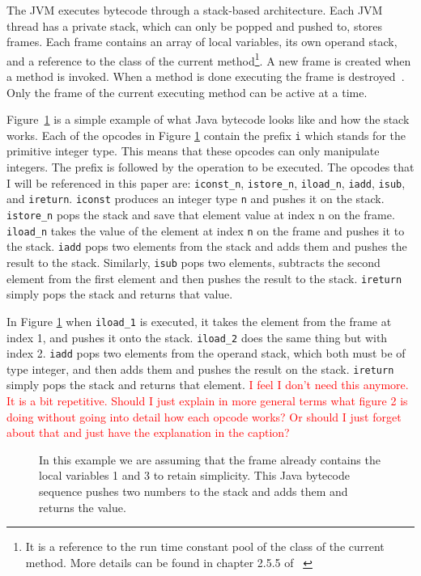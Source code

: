 \documentclass{sig-alternate}
\newcommand{\mycomment}[1]{\textcolor{red}{#1}}
\begin{document}
The JVM executes bytecode through a stack-based architecture. Each JVM thread has a private stack, which can only be popped and pushed to, stores frames. Each frame contains an array of local variables, its own operand stack, and a reference to the class of the current method\footnote{It is a reference to the run time constant pool of the class of the current method. More details can be found in chapter 2.5.5 of ~\cite{JVMspec:2013}}. A new frame is created when a method is invoked. When a method is done executing the frame is destroyed~\cite{Oracle:2013}. Only the frame of the current executing method can be active at a time.

Figure~\ref{stack} is a simple example of what Java bytecode looks like and how the stack works. Each of the opcodes in Figure \ref{stack} contain the prefix \texttt{i} which stands for the primitive integer type. This means that these opcodes can only manipulate integers. The prefix is followed by the operation to be executed. The opcodes that I will be referenced in this paper are: \texttt{iconst\_n}, \texttt{istore\_n}, \texttt{iload\_n}, \texttt{iadd}, \texttt{isub}, and \texttt{ireturn}. \texttt{iconst} produces an integer type \texttt{n} and pushes it on the stack. \texttt{istore\_n} pops the stack and save that element value at index n on the frame. \texttt{iload\_n} takes the value of the element at index \texttt{n} on the frame and pushes it to the stack. \texttt{iadd} pops two elements from the stack and adds them and pushes the result to the stack. Similarly, \texttt{isub} pops two elements, subtracts the second element from the first element and then pushes the result to the stack. \texttt{ireturn} simply pops the stack and returns that value.

In Figure \ref{stack} when \texttt{iload\_1} is executed, it takes the element from the frame at index 1, and pushes it onto the stack. \texttt{iload\_2} does the same thing but with index 2. \texttt{iadd} pops two elements from the operand stack, which both must be of type integer, and then adds them and pushes the result on the stack. \texttt{ireturn} simply pops the stack and returns that element. \mycomment{I feel I don't need this anymore. It is a bit repetitive. Should I just explain in more general terms what figure 2 is doing without going into detail how each opcode works? Or should I just forget about that and just have the explanation in the caption?}


\begin{figure}
\centering
{}

\caption{In this example we are assuming that the frame already contains the local variables 1 and 3 to retain simplicity. This Java bytecode sequence pushes two numbers to the stack and adds them and returns the value.}
\label{stack}
\end{figure}
\end{document}
